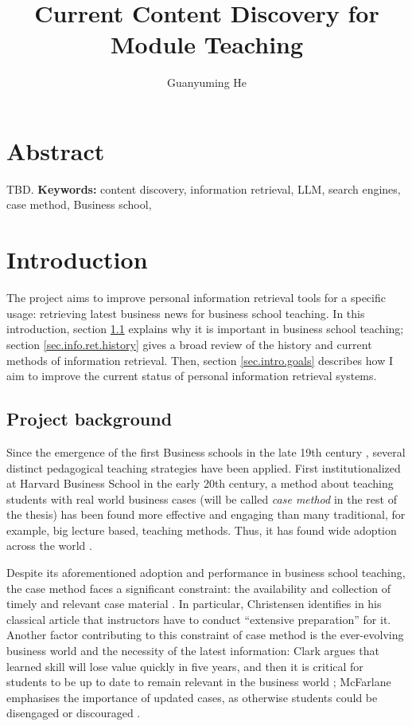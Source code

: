 \documentclass[final-report]{report-template}
\title{Current Content Discovery for Module Teaching}
\author{Guanyuming He}
\newcommand\casemethod{case method}
\begin{document}
\maketitlepage  

\section*{Abstract}
TBD.
\textbf{Keywords:} content discovery, information retrieval, LLM, search
engines, \casemethod, Business school,

\section{Introduction}
The project aims to improve personal information retrieval tools for a specific
usage: retrieving latest business news for business school teaching. In this
introduction, section \ref{sec.proj.bg} explains why it is important in
business school teaching; section \ref{sec.info.ret.history} gives a broad
review of the history and current methods of information retrieval. Then,
section \ref{sec.intro.goals} describes how I aim to improve the current status
of personal information retrieval systems.

\subsection{Project background} \label{sec.proj.bg}
Since the emergence of the first Business schools in the late 19th century
\cite{first.bis.school.1, first.bis.school.2}, several distinct pedagogical
teaching strategies have been applied.  First institutionalized at Harvard
Business School \cite{case.method.origin.1, case.method.origin.2} in the early
20th century, a method about teaching students with real world business cases
(will be called \emph{\casemethod} in the rest of the thesis) has been found
more effective and engaging \cite{case.method.support.1, case.method.support.2,
case.method.support.3} than many traditional, for example, big lecture based,
teaching methods. Thus, it has found wide adoption across the world
\cite{case.method.adoption.1, case.method.adoption.2}.

Despite its aforementioned adoption and performance in business school
teaching, the case method faces a significant constraint: the availability and
collection of timely and relevant case material \cite{case.method.limit.1,
case.method.limit.3}. In particular, Christensen identifies in his classical
article that instructors have to conduct ``extensive preparation''
\cite{case.method.limit.2} for it. Another factor contributing to this
constraint of case method is the ever-evolving business world and the necessity
of the latest information: Clark argues that learned skill will lose
value quickly in five years, and then it is critical for students to be up to
date to remain relevant in the business world \cite{case.method.limit.4};
McFarlane emphasises the importance of updated cases, as otherwise students
could be disengaged or discouraged \cite{case.method.limit.5}.
\end{document}
